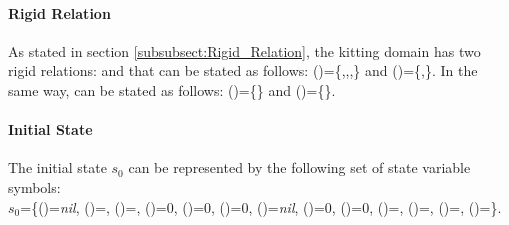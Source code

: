 \paragraph{Rigid Relation}
\begin{comment}
As stated in section \ref{subsubsect:Rigid_Relation}, the kitting domain has two rigid relations: \stvar{efftype} and \stvar{effhtype}. In the proposed example, the \class{EndEffector} \const{eff_1} can hold \class{KitTrays} and \class{KitInstances}, while the \class{EndEffector} \const{eff_1} can hold \class{Parts}. \stvar{efftype} can be stated as follows: \stvar{efftype}(\const{eff_1})=\{\const{kt_1},\const{kins_1}\} and \stvar{efftype}(\const{eff_1})=\{\const{part_{A-1}},\const{part_{A-2}},\const{part_{B}},\const{part_{C}}\}. In the same way, the \class{EndEffectorHolder} \const{effh_1} can hold the \class{EndEffector} \const{eff_1}, while the \class{EndEffectorHolder} \const{effh_2} can hold the \class{EndEffector} \const{eff_2}. \stvar{effhtype} can be stated as follows: \stvar{effhtype}(\const{effh_1})=\{\const{eff_1}\} and \stvar{effhtype}(\const{effh_2})=\{\const{eff_2}\}.
\end{comment}
As stated in section \ref{subsubsect:Rigid_Relation}, the kitting domain has two rigid relations:  and  that can be stated as follows: ()=\{,,,\} and ()=\{,\}. In the same way,  can be stated as follows: ()=\{\} and ()=\{\}.

\paragraph{Initial State}
The initial state $s_0$ can be represented by the following set of state variable symbols:\\
$s_0$=\{()=\textit{nil}, ()=, ()=, ()=0, ()=0, ()=0, ()=\textit{nil}, ()=0, ()=0, ()=, ()=, ()=, ()=\}.

